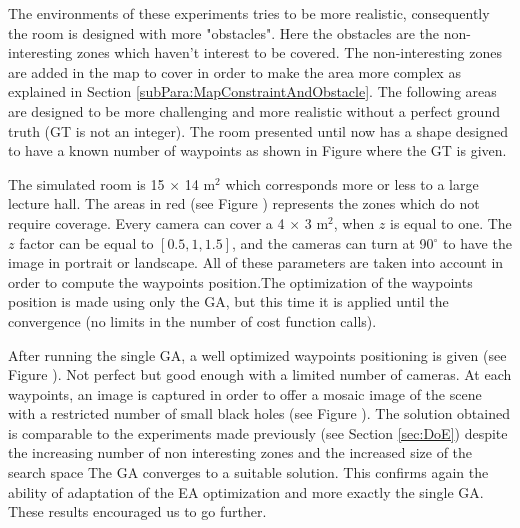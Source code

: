 	The environments of these experiments tries to be more realistic, consequently the room is designed with more "obstacles".  Here the obstacles are the non-interesting zones which haven't interest to be covered.
	The non-interesting zones are added in the map to cover in order to make the area more complex as explained in Section \ref{subPara:MapConstraintAndObstacle}. 
	The following areas are designed to be  more challenging and more realistic without a perfect ground truth (GT is not an integer). The room presented until now has a shape designed to have a known number of waypoints as shown in Figure  where the GT is given. 
	
	The simulated room is 15 $\times$ 14 m$^2$ which corresponds more or less to a large lecture hall. The areas in red (see Figure ) represents the zones which do not require coverage. Every camera can cover a 4 $\times$ 3 m$^2$,  when $z$ is equal to one. The $z$ factor can be equal to $[0.5, 1, 1.5]$, and the cameras can turn  at 90$^{\circ}$ to have the image in portrait or landscape. All of these parameters are taken into account in order to compute the waypoints position.The optimization of the waypoints position is made using  only the GA, but this time it is applied until the convergence (no limits in the number of cost function calls). 
	
	 After running the single GA, a well optimized waypoints positioning is given (see Figure ). Not perfect but good enough with a limited number of cameras. At each waypoints, an image is captured in order to offer a  mosaic image of the scene with a restricted number of small black holes (see Figure ).
	  The solution obtained is comparable to the experiments made previously (see Section \ref{sec:DoE}) despite the increasing number of non interesting zones and the increased size of the search space The GA converges to a suitable solution. This confirms again the ability of adaptation of the EA optimization and more exactly the single GA. These results encouraged us to go further. 

